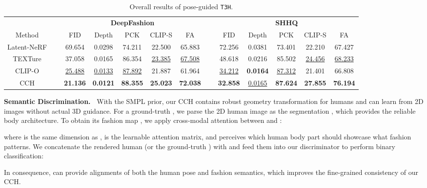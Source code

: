 \documentclass[11pt]{article}
\newcommand{\tablestyle}[2]{\setlength{\tabcolsep}{#1}\renewcommand{\arraystretch}{#2}\centering\footnotesize}
\begin{document}
\begin{table*}[t]
\centering \tablestyle{5pt}{1.1}
    \begin{tabular}{ccccccccccccc}
        \toprule
        ~ & ~ & \multicolumn{5}{c}{\textbf{DeepFashion}} & ~ & \multicolumn{5}{c}{\textbf{SHHQ}} \\
        \cmidrule{3-7} \cmidrule{9-13} Method & ~ & FID & Depth & PCK & CLIP-S & FA & ~ & FID & Depth & PCK & CLIP-S & FA \\
        \midrule
        Latent-NeRF & ~ & 69.654 & 0.0298 & 74.211 & 22.500 & 65.883 & ~ & 72.256 & 0.0381 & 73.401 & 22.210 & 67.427 \\
        TEXTure & ~ & 37.058 & 0.0165 & 86.354 & \underline{23.385} & \underline{67.508} & ~ & 48.618 & 0.0216 & 85.502 & \underline{24.456} & \underline{68.233} \\
        CLIP-O & ~ & \underline{25.488} & \underline{0.0133} & \underline{87.892} & 21.887 & 61.964 & ~ & \underline{34.212} & \textbf{0.0164} & \underline{87.312} & 21.401 & 66.808 \\
        CCH & ~ & \textbf{21.136} & \textbf{0.0121} & \textbf{88.355} & \textbf{25.023} & \textbf{72.038} & ~ & \textbf{32.858} & \underline{0.0165} & \textbf{87.624} & \textbf{27.855} & \textbf{76.194} \\
        \bottomrule
    \end{tabular}
    \vspace{-1.5ex}
    \caption{Overall results of pose-guided \texttt{T3H}.}
    \label{table:pose-guide}
    \vspace{-3ex}
\end{table*}

\vspace{1ex} \noindent \textbf{Semantic Discrimination.~}
With the SMPL prior, our CCH contains robust geometry transformation for humans and can learn from 2D images without actual 3D guidance. For a ground-truth , we parse the 2D human image as the segmentation  \cite{mmhuman3d},  which provides the reliable body architecture. To obtain its fashion map , we apply cross-modal attention between  and :

where  is the same dimension as ,  is the learnable attention matrix, and  perceives which human body part should showcase what fashion patterns. We concatenate the rendered human  (or the ground-truth ) with  and feed them into our discriminator  to perform binary classification:

In consequence,  can provide alignments of both the human pose and fashion semantics, which improves the fine-grained consistency of our CCH.
\end{document}
